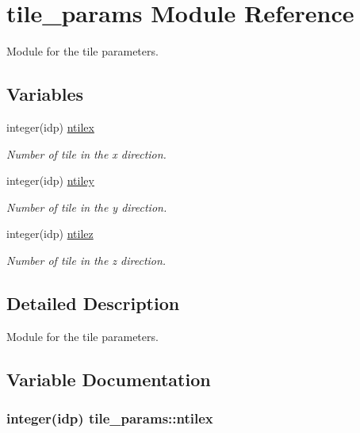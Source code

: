 \hypertarget{namespacetile__params}{}\section{tile\+\_\+params Module Reference}
\label{namespacetile__params}


Module for the tile parameters.  


\subsection*{Variables}
\begin{DoxyCompactItemize}
\item 
integer(idp) \hyperlink{namespacetile__params_a7208f23629d2bb2074bd84e2d014932c}{ntilex}
\begin{DoxyCompactList}\small\item\em Number of tile in the x direction. \end{DoxyCompactList}\item 
integer(idp) \hyperlink{namespacetile__params_a820079c73bdf0bd85aa8d2cf6b1a2b40}{ntiley}
\begin{DoxyCompactList}\small\item\em Number of tile in the y direction. \end{DoxyCompactList}\item 
integer(idp) \hyperlink{namespacetile__params_ac5c03752e70281443173d320d476f1e9}{ntilez}
\begin{DoxyCompactList}\small\item\em Number of tile in the z direction. \end{DoxyCompactList}\end{DoxyCompactItemize}


\subsection{Detailed Description}
Module for the tile parameters. 

\subsection{Variable Documentation}
\subsubsection[{\texorpdfstring{ntilex}{ntilex}}]{\setlength{\rightskip}{0pt plus 5cm}integer(idp) tile\+\_\+params\+::ntilex}\hypertarget{namespacetile__params_a7208f23629d2bb2074bd84e2d014932c}{}\label{namespacetile__params_a7208f23629d2bb2074bd84e2d014932c}


